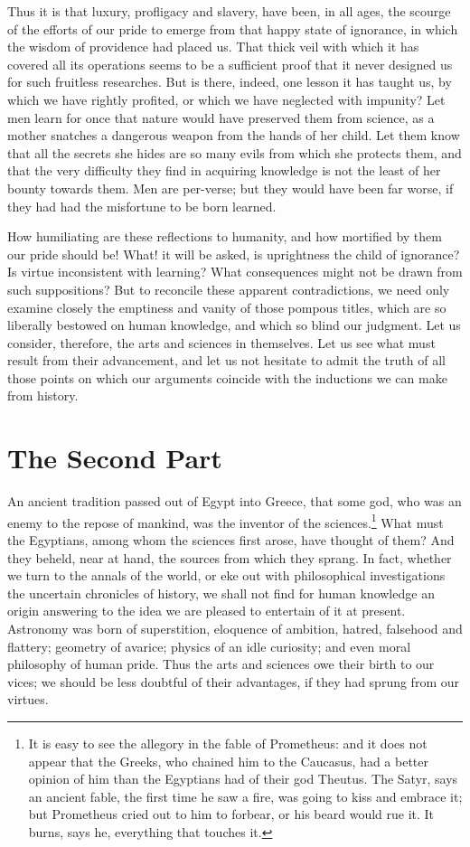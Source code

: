 Thus it is that luxury, profligacy and slavery, have been, in all
ages, the scourge of the efforts of our pride to emerge from that
happy state of ignorance, in which the wisdom of providence had placed
us. That thick veil with which it has covered all its operations seems
to be a sufficient proof that it never designed us for such fruitless
researches. But is there, indeed, one lesson it has taught us, by
which we have rightly profited, or which we have neglected with
impunity? Let men learn for once that nature would have preserved them
from science, as a mother snatches a dangerous weapon from the hands
of her child. Let them know that all the secrets she hides are so many
evils from which she protects them, and that the very difficulty they
find in acquiring knowledge is not the least of her bounty towards
them. Men are per-verse; but they would have been far worse,
if they had had the misfortune to be born learned.

How humiliating are these reflections to humanity, and how mortified
by them our pride should be! What! it will be asked, is uprightness
the child of ignorance? Is virtue inconsistent with learning? What
consequences might not be drawn from such suppositions? But to
reconcile these apparent contradictions, we need only examine closely
the emptiness and vanity of those pompous titles, which are so
liberally bestowed on human knowledge, and which so blind our
judgment. Let us consider, therefore, the arts and sciences in
themselves. Let us see what must result from their advancement, and
let us not hesitate to admit the truth of all those points on which
our arguments coincide with the inductions we can make from history.

\section*{The Second Part}

An ancient tradition passed out of Egypt into Greece, that some god,
who was an enemy to the repose of mankind, was the inventor of the
sciences.\footnote{It is easy to see the allegory in the fable of
Prometheus: and it does not appear that the Greeks, who chained him to
the Caucasus, had a better opinion of him than the Egyptians had of
their god Theutus. The Satyr, says an ancient fable, the first time he
saw a fire, was going to kiss and embrace it; but Prometheus cried out
to him to forbear, or his beard would rue it. It burns, says he,
everything that touches it.} What must the Egyptians, among whom the
sciences first arose, have thought of them? And they beheld, near at
hand, the sources from which they sprang. In fact, whether we turn to
the annals of the world, or eke out with philosophical investigations
the uncertain chronicles of history, we shall not find for human
knowledge an origin answering to the idea we are pleased to entertain
of it at present. Astronomy was born of superstition, eloquence of
ambition, hatred, falsehood and flattery; geometry of avarice; physics
of an idle curiosity; and even moral philosophy of human pride. Thus
the arts and sciences owe their birth to our vices; we should be less
doubtful of their advantages, if they had sprung from our virtues.

